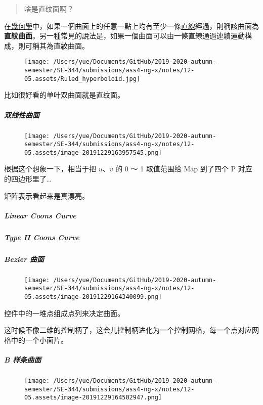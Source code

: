 \documentclass[
]{article}
\begin{document}
\begin{quote}
啥是直纹面啊？
\end{quote}

在\href{https://zh.wikipedia.org/wiki/幾何學}{幾何學}中，如果一個曲面上的任意一點上均有至少一條\href{https://zh.wikipedia.org/wiki/直線}{直線}經過，則稱該曲面為\textbf{直紋曲面}。另一種常見的說法是，如果一個曲面可以由一條直線通過連續運動構成，則可稱其為直紋曲面。

\begin{figure}
\centering
\texttt{[image: /Users/yue/Documents/GitHub/2019-2020-autumn-semester/SE-344/submissions/ass4-ng-x/notes/12-05.assets/Ruled\_hyperboloid.jpg]}
\caption{}
\end{figure}

比如很好看的单叶双曲面就是直纹面。

\hypertarget{header-n102}{%
\subparagraph{双线性曲面}\label{header-n102}}

\begin{figure}
\centering
\texttt{[image: /Users/yue/Documents/GitHub/2019-2020-autumn-semester/SE-344/submissions/ass4-ng-x/notes/12-05.assets/image-20191229163957545.png]}
\caption{}
\end{figure}

根据这个想象一下，相当于把 \(u\)、\(v\) 的 0 ～ 1 取值范围给 Map
到了四个 P 对应的四边形里了\ldots{}

矩阵表示看起来是真漂亮。

\hypertarget{header-n106}{%
\subparagraph{Linear Coons Curve}\label{header-n106}}

\hypertarget{header-n107}{%
\subparagraph{Type II Coons Curve}\label{header-n107}}

\hypertarget{header-n108}{%
\subparagraph{Bezier 曲面}\label{header-n108}}

\begin{figure}
\centering
\texttt{[image: /Users/yue/Documents/GitHub/2019-2020-autumn-semester/SE-344/submissions/ass4-ng-x/notes/12-05.assets/image-20191229164340099.png]}
\caption{}
\end{figure}

控件中的一堆点组成点列来决定曲面。

这时候不像二维的控制柄了，这会儿控制柄进化为一个控制网格，每一个点对应网格中的一个小面片。

\hypertarget{header-n112}{%
\subparagraph{B 样条曲面}\label{header-n112}}

\begin{figure}
\centering
\texttt{[image: /Users/yue/Documents/GitHub/2019-2020-autumn-semester/SE-344/submissions/ass4-ng-x/notes/12-05.assets/image-20191229164502947.png]}
\caption{}
\end{figure}
\end{document}
